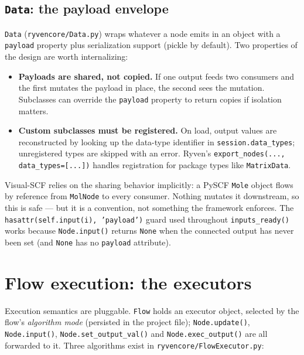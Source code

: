 \documentclass[10pt,a4paper]{article}
\newcommand{\code}[1]{\texttt{\small #1}}
\begin{document}
\subsection{\texttt{Data}: the payload envelope}

\code{Data} (\code{ryvencore/Data.py}) wraps whatever a node emits in an object with a
\code{payload} property plus serialization support (pickle by default). Two properties
of the design are worth internalizing:

\begin{itemize}
\item \textbf{Payloads are shared, not copied.} If one output feeds two consumers and
      the first mutates the payload in place, the second sees the mutation. Subclasses
      can override the \code{payload} property to return copies if isolation matters.
\item \textbf{Custom subclasses must be registered.} On load, output values are
      reconstructed by looking up the data-type identifier in
      \code{session.data\_types}; unregistered types are skipped with an error. Ryven's
      \code{export\_nodes(..., data\_types=[...])} handles registration for package
      types like \code{MatrixData}.
\end{itemize}

\begin{scfnote}
Visual-SCF relies on the sharing behavior implicitly: a PySCF \code{Mole} object
flows by reference from \code{MolNode} to every consumer. Nothing mutates it
downstream, so this is safe --- but it is a convention, not something the framework
enforces. The \code{hasattr(self.input(i), 'payload')} guard used throughout
\code{inputs\_ready()} works because \code{Node.input()} returns \code{None} when the
connected output has never been set (and \code{None} has no \code{payload} attribute).
\end{scfnote}

\section{Flow execution: the executors}
\label{sec:executors}

Execution semantics are pluggable. \code{Flow} holds an executor object, selected by the
flow's \emph{algorithm mode} (persisted in the project file); \code{Node.update()},
\code{Node.input()}, \code{Node.set\_output\_val()} and \code{Node.exec\_output()} are
all forwarded to it. Three algorithms exist in
\code{ryvencore/FlowExecutor.py}:
\end{document}
